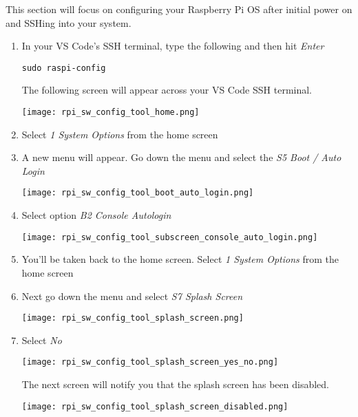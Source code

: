 \documentclass[journal]{IEEEtran}
\begin{document}
    This section will focus on configuring your Raspberry Pi OS after initial power on and SSHing into your system. \newline

    \begin{enumerate}
        \item In your VS Code's SSH terminal, type the following and then hit \emph{Enter}
        
        \begin{lstlisting}[frame=single]
            sudo raspi-config
        \end{lstlisting}

        The following screen will appear across your VS Code SSH terminal. \newline

        \texttt{[image: rpi\_sw\_config\_tool\_home.png]}

        \item Select \emph{1 System Options} from the home screen

        \item A new menu will appear. Go down the menu and select the \emph{S5 Boot / Auto Login}
        
        \texttt{[image: rpi\_sw\_config\_tool\_boot\_auto\_login.png]}

        \item Select option \emph{B2 Console Autologin}
        
        \texttt{[image: rpi\_sw\_config\_tool\_subscreen\_console\_auto\_login.png]}

        \item You'll be taken back to the home screen. Select \emph{1 System Options} from the home screen

        \item Next go down the menu and select \emph{S7 Splash Screen}
        
        \texttt{[image: rpi\_sw\_config\_tool\_splash\_screen.png]}

        \item Select \emph{No}
        
        \texttt{[image: rpi\_sw\_config\_tool\_splash\_screen\_yes\_no.png]}

        The next screen will notify you that the splash screen has been disabled. \newline

        \texttt{[image: rpi\_sw\_config\_tool\_splash\_screen\_disabled.png]}


\end{enumerate}
\end{document}
